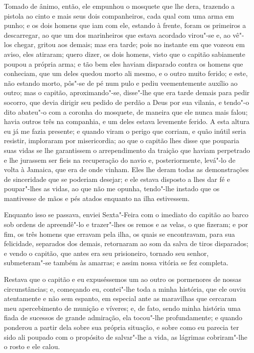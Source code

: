 Tomado de ânimo, então, ele empunhou o mosquete que lhe dera, trazendo a
pistola ao cinto e mais seus dois companheiros, cada qual com uma arma
em punho; e os dois homens que iam com ele, estando à frente, foram os
primeiros a descarregar, ao que um dos marinheiros que estava acordado
virou"-se e, ao vê"-los chegar, gritou aos demais; mas era tarde; pois no
instante em que vozeou em aviso, eles atiraram; quero dizer, os dois
homens, visto que o capitão sabiamente poupou a própria arma; e tão bem
eles haviam disparado contra os homens que conheciam, que um deles
quedou morto ali mesmo, e o outro muito ferido; e este, não estando
morto, pôs"-se de pé num pulo e pediu veementemente auxílio ao outro; mas
o capitão, aproximando"-se, disse"-lhe que era tarde demais para pedir
socorro, que devia dirigir seu pedido de perdão a Deus por sua vilania,
e tendo"-o dito abateu"-o com a coronha do mosquete, de maneira que ele
nunca mais falou; havia outros três na companhia, e um deles estava
levemente ferido. A esta altura eu já me fazia presente; e quando viram
o perigo que corriam, e quão inútil seria resistir, imploraram por
misericordia; ao que o capitão lhes disse que pouparia suas vidas se lhe
garantissem o arrependimento da traição que haviam perpetrado e lhe
jurassem ser fieis na recuperação do navio e, posteriormente, levá"-lo de
volta à Jamaica, que era de onde vinham. Eles lhe deram todas as
demonstrações de sinceridade que se poderiam desejar; e ele estava
disposto a lhes dar fé e poupar"-lhes as vidas, ao que não me opunha,
tendo"-lhe instado que os mantivesse de mãos e pés atados enquanto na
ilha estivessem.

Enquanto isso se passava, enviei Sexta"-Feira com o imediato do capitão
ao barco sob ordens de apreendê"-lo e trazer"-lhes os remos e as velas, o
que fizeram; e por fim, os três homens que erravam pela ilha, os quais
se encontravam, para sua felicidade, separados dos demais, retornaram ao
som da salva de tiros disparados; e vendo o capitão, que antes era seu
prisioneiro, tornado seu senhor, submeteram"-se também às amarras; e
assim nossa vitória se fez completa.

Restava que o capitão e eu expuséssemos um ao outro os pormenores de
nossas circunstâncias; e, começando eu, contei"-lhe toda a minha
história, que ele ouviu atentamente e não sem espanto, em especial ante
as maravilhas que cercaram meu apercebimento de munição e víveres; e, de
fato, sendo minha história uma fiada de sucessos de grande admiração,
ela tocou"-lhe profundamente; e quando ponderou a partir dela sobre sua
própria situação, e sobre como eu parecia ter sido ali poupado com o
propósito de salvar"-lhe a vida, as lágrimas cobriram"-lhe o rosto e ele
calou.

